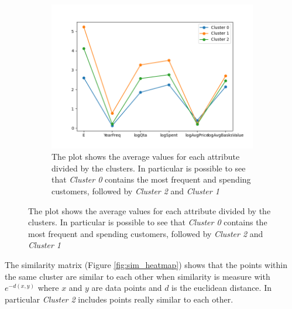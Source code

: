 \begin{figure}[h!]
    \begin{subfigure}{0.49\textwidth}
        \includegraphics[width=\linewidth]{img/clust_1/cluster_avg.png}
        \caption{The plot shows the average values for each attribute divided by the clusters. In particular is possible to see that \emph{Cluster 0} contains the most frequent and spending customers, followed by \emph{Cluster 2} and \emph{Cluster 1}}
        \label{fig:km_avg}
    \end{subfigure}
\end{figure}

The similarity matrix (Figure \ref{fig:sim_heatmap}) shows that the points within the same cluster are similar to each other when similarity is measure with $e^{-d(x, y)}$ where $x$ and $y$ are data points and $d$ is the euclidean distance. In particular \emph{Cluster 2} includes points really similar to each other.

